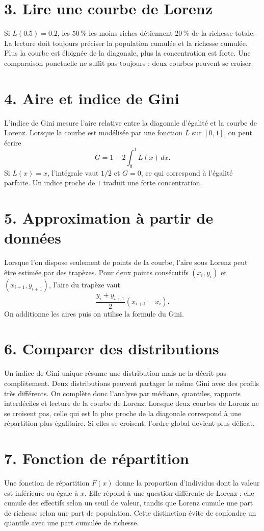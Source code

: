 \section{3. Lire une courbe de Lorenz}
Si $L(0.5)=0.2$, les $50\,\%$ les moins riches détiennent $20\,\%$ de la richesse totale. La lecture doit toujours préciser la population cumulée et la richesse cumulée.
Plus la courbe est éloignée de la diagonale, plus la concentration est forte. Une comparaison ponctuelle ne suffit pas toujours : deux courbes peuvent se croiser.
\section{4. Aire et indice de Gini}
L'indice de Gini mesure l'aire relative entre la diagonale d'égalité et la courbe de Lorenz. Lorsque la courbe est modélisée par une fonction $L$ sur $[0,1]$, on peut écrire
\[
G=1-2\int_0^1L(x)\,dx.
\]
Si $L(x)=x$, l'intégrale vaut $1/2$ et $G=0$, ce qui correspond à l'égalité parfaite. Un indice proche de $1$ traduit une forte concentration.
\section{5. Approximation à partir de données}
Lorsque l'on dispose seulement de points de la courbe, l'aire sous Lorenz peut être estimée par des trapèzes. Pour deux points consécutifs $(x_i,y_i)$ et $(x_{i+1},y_{i+1})$, l'aire du trapèze vaut
\[
\frac{y_i+y_{i+1}}{2}(x_{i+1}-x_i).
\]
On additionne les aires puis on utilise la formule du Gini.
\section{6. Comparer des distributions}
Un indice de Gini unique résume une distribution mais ne la décrit pas complètement. Deux distributions peuvent partager le même Gini avec des profils très différents. On complète donc l'analyse par médiane, quantiles, rapports interdéciles et lecture de la courbe de Lorenz.
Lorsque deux courbes de Lorenz ne se croisent pas, celle qui est la plus proche de la diagonale correspond à une répartition plus égalitaire. Si elles se croisent, l'ordre global devient plus délicat.
\section{7. Fonction de répartition}
Une fonction de répartition $F(x)$ donne la proportion d'individus dont la valeur est inférieure ou égale à $x$. Elle répond à une question différente de Lorenz : elle cumule des effectifs selon un seuil de valeur, tandis que Lorenz cumule une part de richesse selon une part de population.
Cette distinction évite de confondre un quantile avec une part cumulée de richesse.

